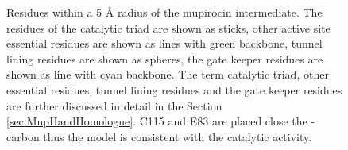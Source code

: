 			\setlength\fboxsep{5pt}
			\setlength\fboxrule{1.5pt}
			\begin{figure}[]
			\centering
			\caption[Residues within a 5 \AA{} radius of the mupirocin intermediate.]{Residues within a 5 \AA{} radius of the mupirocin  intermediate. The residues of the catalytic triad are shown as sticks, other active site essential residues are shown as lines with green backbone, tunnel lining residues are shown as spheres, the gate keeper residues are shown as line with cyan backbone. The term catalytic triad, other essential residues, tunnel lining residues and the gate keeper residues are further discussed in detail in the Section \ref{sec:MupHandHomologue}. C115 and E83 are placed close the \bet-carbon thus the model is consistent with the catalytic activity.}
			\label{fig:5around}
			\end{figure}	
				
